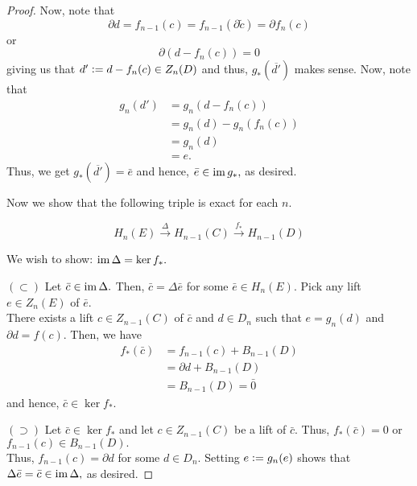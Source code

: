 \documentclass[12pt]{article}
\begin{document}
\begin{proof}
	Now, note that
	\begin{equation*} 
		\partial d = f_{n-1}(c) = f_{n-1}(\partial \tilde{c}) = \partial f_n(c)
	\end{equation*}
	or
	\begin{equation*} 
		\partial(d - f_n(c)) = 0
	\end{equation*}
	giving us that $d' \vcentcolon= d - f_n(c) \in Z_n(D)$ and thus, $g_*(\overline{d'})$ makes sense. Now, note that
	\begin{align*} 
		g_n(d') &= g_n(d - f_n(c))\\
		&= g_n(d) - g_n(f_n(c))\\
		&= g_n(d)\\
		&= e.	
	\end{align*}
	Thus, we get $g_*(\overline{d'}) = \bar{e}$ and hence, $\bar{e} \in \operatorname{im} g_*,$ as desired.
	
	\dotfill
	
	Now we show that the following triple is exact for each $n.$

	\begin{equation*} 
		H_n(E)\overset{\Delta}{\longrightarrow}H_{n-1}(C)\overset{f_*}{\longrightarrow}H_{n-1}(D)
	\end{equation*}
	
	We wish to show: $\operatorname{im} \Delta = \ker f_*.$
	
	$(\subset)$ Let $\bar{c} \in \operatorname{im} \Delta.$ Then, $\bar{c} = \Delta \bar{e}$ for some $\bar{e} \in H_{n}(E).$ Pick any lift $e \in Z_n(E)$ of $\bar{e}.$\\
	There exists a lift $c \in Z_{n-1}(C)$ of $\bar{c}$ and $d \in D_n$ such that $e = g_n(d)$ and $\partial d = f(c).$ Then, we have
	\begin{align*} 
		f_*(\bar{c}) &= f_{n-1}(c) + B_{n-1}(D)\\
		&= \partial d + B_{n-1}(D)\\
		&= B_{n-1}(D) = \bar{0}
	\end{align*}
	and hence, $\bar{c} \in \ker f_*.$

	$(\supset)$ Let $\bar{c} \in \ker f_*$ and let $c \in Z_{n-1}(C)$ be a lift of $\bar{c}.$ Thus, $f_*(\bar{c}) = 0$ or $f_{n-1}(c) \in B_{n-1}(D).$\\
	Thus, $f_{n-1}(c) = \partial d$ for some $d \in D_n.$ Setting $e \vcentcolon= g_{n}(e)$ shows that $\Delta \bar{e} = \bar{c} \in \operatorname{im} \Delta,$ as desired.
\end{proof}
\end{document}
